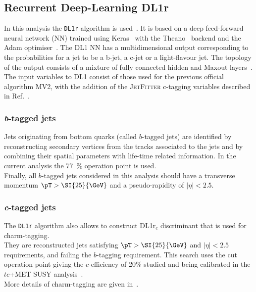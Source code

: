 \subsection{Recurrent Deep-Learning DL1r}
In this analysis the \texttt{DL1r} algorithm is used~\cite{ATL-PHYS-PUB-2017-013,Aad:2019aic}.
It is based on a deep feed-forward neural network (NN) trained using Keras~\cite{keras} with the Theano~\cite{theano} backend and the Adam optimiser~\cite{adam}. The DL1 NN has a multidimensional output corresponding to the probabilities for a jet to be a b-jet, a c-jet or a light-flavour jet. The topology of the output consists of a mixture of fully connected hidden and Maxout layers~\cite{goodfellow2013maxout}. The input variables to DL1 consist of those used for the previous official algorithm MV2, with the addition of the \textsc{JetFitter} c-tagging variables described in Ref.~\cite{Aad:2019aic}.
\subsubsection {\textit{b}-tagged jets}
\label{sec:object:bjet}
Jets originating from bottom quarks (called $b$-tagged jets) are
identified by reconstructing secondary vertices from the tracks
associated to the jets and by combining their spatial parameters with
life-time related information.
In the current  analysis the \SI{77}{\%} operation point is used.\\
Finally, all $b$-tagged jets considered in this analysis should have a transverse
momentum $\pT > \SI{25}{\GeV}$ and a pseudo-rapidity of
$|\eta|\!<\!2.5$.  
\subsubsection {\textit{c}-tagged jets}
\label{sec:object:cjet}
The \texttt{DL1r} algorithm also allows to construct DL1r$_{c}$ discriminant that is used for charm-tagging.\\
They are reconstructed jets satisfying $\pT > \SI{25}{\GeV}$ and $|\eta| < 2.5$ requirements,
and failing the $b$-tagging requirement.
This search uses the cut operation point giving the $c$-efficiency of 20\% studied and being calibrated
in the $tc$+MET SUSY analysis~\cite{ANA-SUSY-2019-23}.\\
More details of charm-tagging are given in~.

